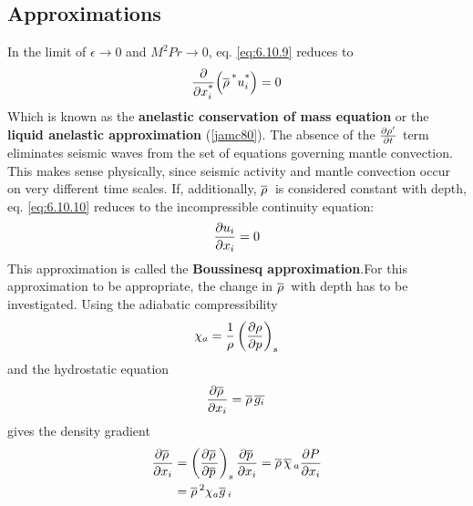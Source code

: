 \documentclass[document.tex]{subfiles}
\begin{document}
\subsection{Approximations}
In the limit of $\epsilon \to 0$ and $M^2Pr \to 0$, eq. \ref{eq:6.10.9} reduces to 
\begin{equation}
    \label{eq:6.10.10}
    \pdv{\ensuremath x_i^{\textup{*}}}(\overline{\rho}\,^{\textup{*}} u_i^{\textup{*}}) = 0
\end{equation}
Which is known as the \textbf{anelastic conservation of mass equation} or the \textbf{liquid anelastic 
approximation} (\ref{jamc80}).
The absence of the $\pdv{\rho'}{t}$ term eliminates seismic waves from the set of equations 
governing mantle convection. This makes sense physically, since seismic activity and 
mantle convection occur on very different time scales. 
If, additionally, $\overline{\rho}\,$ is considered constant with depth, eq. \ref{eq:6.10.10} reduces to the incompressible 
continuity equation: 
\begin{equation}
    \label{eq:incompressible continuity}
    \pdv{u_i}{x_i} = 0 
\end{equation} 
This approximation is called the \textbf{Boussinesq approximation}.For this approximation to be appropriate, the change in $\overline{\rho}\,$ with depth
has to be investigated. Using the adiabatic compressibility
\begin{equation}
    \chi_a = \frac{1}{\rho} \left(\pdv{\rho}{p}\right)_s
\end{equation}
and the hydrostatic equation 
\begin{equation}
    \pdv{\overline{\rho}\,}{x_i} = \overline{\rho}\,\overline{g_i}\,
\end{equation}
gives the density gradient 
\begin{align}
    \begin{split}
        \pdv{\overline{\rho}\,}{x_i} &= \left(\pdv{\overline{\rho}\,}{\overline{p}\,}\right)_s 
        \pdv{\overline{p}\,}{x_i} = \overline{\rho}\,\overline{\chi}\,_a \pdv{P}{x_i} \\
    &= \overline{\rho}\,^2\chi_a\overline{g}\,_i
    \end{split}
\end{align}
\end{document}
